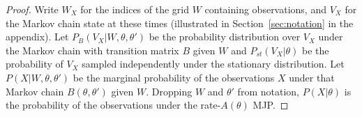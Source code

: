 \begin{proof}
Write $W_X$ for the indices of the grid $W$ containing observations, 
and $V_X$ for the Markov chain state at these times (illustrated 
in Section~\ref{sec:notation} in the appendix).
Let $P_B(V_X | W, \theta, \theta')$ be the probability distribution over
$V_X$ under the Markov chain with transition matrix $B$ given 
$W$ and $P_{st}(V_X|\theta)$ be the probability of $V_X$ sampled
independently under the stationary distribution. 
Let $P(X | W, \theta, \theta')$ be the marginal probability of the 
observations $X$ under that Markov chain $B(\theta,\theta')$ given $W$. Dropping $W$ and 
$\theta'$ from notation, $P(X|\theta)$
is the probability of the observations under the rate-$A(\theta)$ MJP.


\end{proof}
